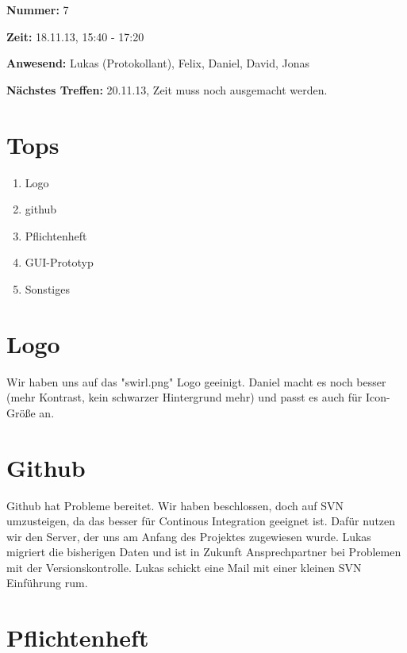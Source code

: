 \documentclass[a4paper]{article}
\begin{document}
\textbf{Nummer:} 7

\textbf{Zeit:} 18.11.13, 15:40 - 17:20

\textbf{Anwesend:} Lukas (Protokollant), Felix, Daniel, David, Jonas

\textbf{Nächstes Treffen:} 20.11.13, Zeit muss noch ausgemacht werden.

\section{Tops}
\begin{enumerate}
	\item Logo
	\item github
	\item Pflichtenheft
	\item GUI-Prototyp
	\item Sonstiges
\end{enumerate}

\section{Logo}

Wir haben uns auf das "swirl.png" Logo geeinigt. Daniel macht es noch besser (mehr Kontrast, kein schwarzer Hintergrund mehr) und passt es auch für Icon-Größe an.

\section{Github}

Github hat Probleme bereitet. Wir haben beschlossen, doch auf SVN umzusteigen, da das besser für Continous Integration geeignet ist. Dafür nutzen wir den Server, der uns am Anfang des Projektes zugewiesen wurde. Lukas migriert die bisherigen Daten und ist in Zukunft Ansprechpartner bei Problemen mit der Versionskontrolle. Lukas schickt eine Mail mit einer kleinen SVN Einführung rum.

\section{Pflichtenheft}
\end{document}
